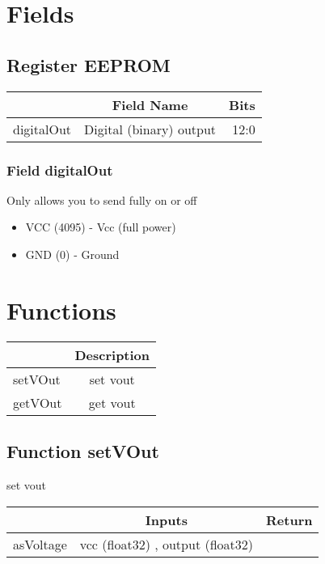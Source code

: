 \documentclass[a4paper,12pt,oneside,pdflatex,italian,final,twocolumn]{article}
\begin{document}
\section{Fields}

 


\raggedright

\subsection{Register EEPROM}
\centering
\begin{tabular}{lcr}
\toprule
  & Field Name & Bits \\
\midrule
digitalOut & Digital (binary) output & 
12:0
\\
\bottomrule

\end{tabular}


\raggedright

\subsubsection{Field digitalOut }

Only allows you to send fully on or off


\begin{itemize}
\item VCC (4095) - Vcc (full power)
\item GND (0) - Ground
\end{itemize}




\raggedright


\section{Functions}

\centering
\begin{tabular}{lc}
\toprule
  & Description \\
\midrule
setVOut & set vout \\
getVOut & get vout \\
\bottomrule
\end{tabular}


\raggedright
\subsection{Function setVOut }
set vout \\

\centering
\begin{tabular}{lcr}
\toprule
  & Inputs & Return \\
\midrule
asVoltage &
vcc (float32)
, 
output (float32)

&
\\
\bottomrule
\end{tabular}
\end{document}
